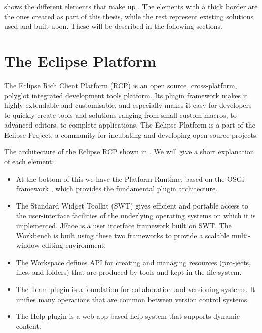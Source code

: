 	
	 shows the different elements that make up \thename{}.
	The elements with a thick border are the ones created as part of this thesis,
	while the rest represent existing solutions used and built upon. These will
	be described in the following sections. 

\section{The Eclipse Platform}
The Eclipse Rich Client Platform (RCP) \cite{eclipse} is an open source,
cross-platform, polyglot integrated development tools platform.
Its plugin framework makes it highly extendable and customisable, and
especially makes it easy for developers to quickly create tools and
solutions ranging from small custom macros, to advanced editors, to complete
applications. The Eclipse Platform is a part of the Eclipse Project, a community
for incubating and developing open source projects. 


The architecture of the Eclipse RCP shown in . We will
give a short explanation of each element:

\begin{itemize}
	\item At the bottom of this we have the Platform Runtime, based on the OSGi
	framework \cite{alliance2007osgi}, which provides the fundamental plugin
	architecture.

	\item The Standard Widget Toolkit (SWT) gives efficient and portable access to
	the user-interface facilities of the underlying operating systems on which it is
	implemented. JFace is a user interface framework built on SWT. The Workbench
	is built using these two frameworks to provide a scalable multi-window editing
	environment.
	
	\item The Workspace defines API for creating and managing resources 
	(pro-jects, files, and folders) that are produced by tools and kept in the file
	system.
	
	\item The Team plugin is a foundation for collaboration and versioning systems.
	It unifies many operations that are common between version control systems.
	
	\item The Help plugin is a web-app-based help system that supports dynamic
	content.
\end{itemize}
	
